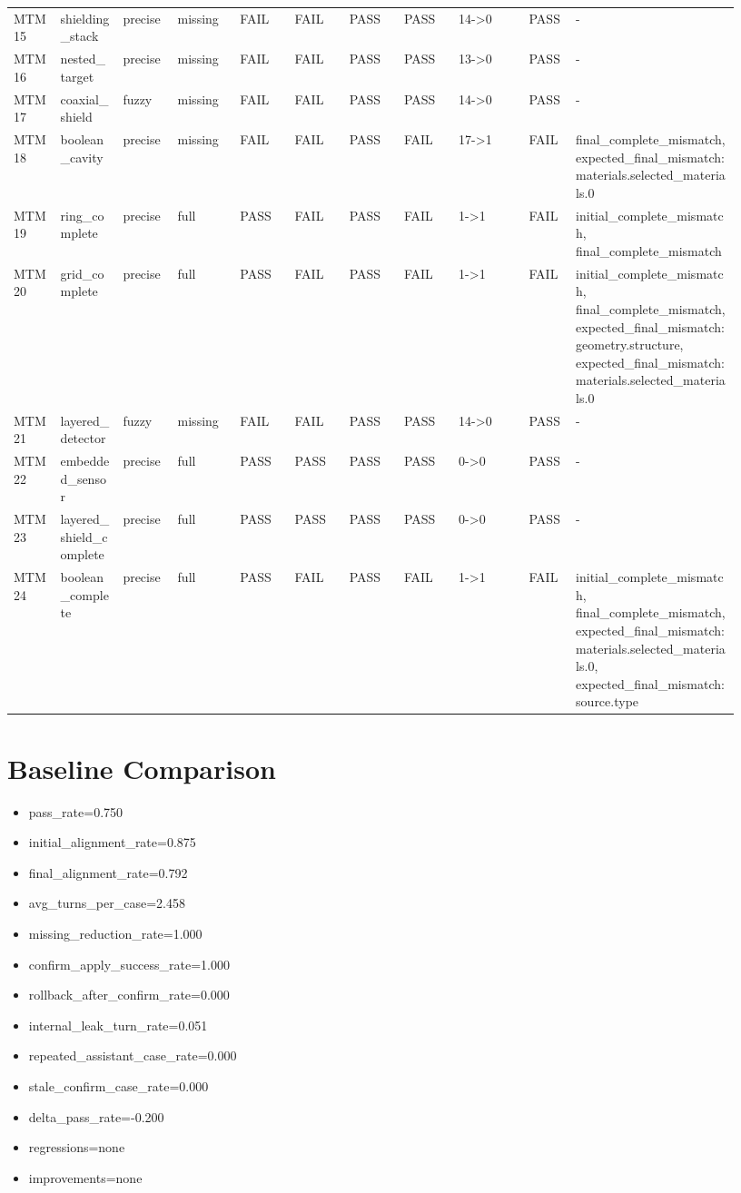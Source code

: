 \documentclass[11pt]{ctexart}
\begin{document}
\begin{longtable}{p{0.06\linewidth}p{0.08\linewidth}p{0.07\linewidth}p{0.08\linewidth}p{0.07\linewidth}p{0.07\linewidth}p{0.07\linewidth}p{0.07\linewidth}p{0.09\linewidth}p{0.06\linewidth}p{0.21\linewidth}}
MTM15 & shielding\_stack & precise & missing & FAIL & FAIL & PASS & PASS & 14->0 & PASS & - \\
MTM16 & nested\_target & precise & missing & FAIL & FAIL & PASS & PASS & 13->0 & PASS & - \\
MTM17 & coaxial\_shield & fuzzy & missing & FAIL & FAIL & PASS & PASS & 14->0 & PASS & - \\
MTM18 & boolean\_cavity & precise & missing & FAIL & FAIL & PASS & FAIL & 17->1 & FAIL & final\_complete\_mismatch, expected\_final\_mismatch:materials.selected\_materials.0 \\
MTM19 & ring\_complete & precise & full & PASS & FAIL & PASS & FAIL & 1->1 & FAIL & initial\_complete\_mismatch, final\_complete\_mismatch \\
MTM20 & grid\_complete & precise & full & PASS & FAIL & PASS & FAIL & 1->1 & FAIL & initial\_complete\_mismatch, final\_complete\_mismatch, expected\_final\_mismatch:geometry.structure, expected\_final\_mismatch:materials.selected\_materials.0 \\
MTM21 & layered\_detector & fuzzy & missing & FAIL & FAIL & PASS & PASS & 14->0 & PASS & - \\
MTM22 & embedded\_sensor & precise & full & PASS & PASS & PASS & PASS & 0->0 & PASS & - \\
MTM23 & layered\_shield\_complete & precise & full & PASS & PASS & PASS & PASS & 0->0 & PASS & - \\
MTM24 & boolean\_complete & precise & full & PASS & FAIL & PASS & FAIL & 1->1 & FAIL & initial\_complete\_mismatch, final\_complete\_mismatch, expected\_final\_mismatch:materials.selected\_materials.0, expected\_final\_mismatch:source.type \\
\bottomrule
\end{longtable}
\section{Baseline Comparison}
\begin{itemize}
\item pass\_rate=0.750
\item initial\_alignment\_rate=0.875
\item final\_alignment\_rate=0.792
\item avg\_turns\_per\_case=2.458
\item missing\_reduction\_rate=1.000
\item confirm\_apply\_success\_rate=1.000
\item rollback\_after\_confirm\_rate=0.000
\item internal\_leak\_turn\_rate=0.051
\item repeated\_assistant\_case\_rate=0.000
\item stale\_confirm\_case\_rate=0.000
\item delta\_pass\_rate=-0.200
\item regressions=none
\item improvements=none
\end{itemize}
\appendix
\end{document}
